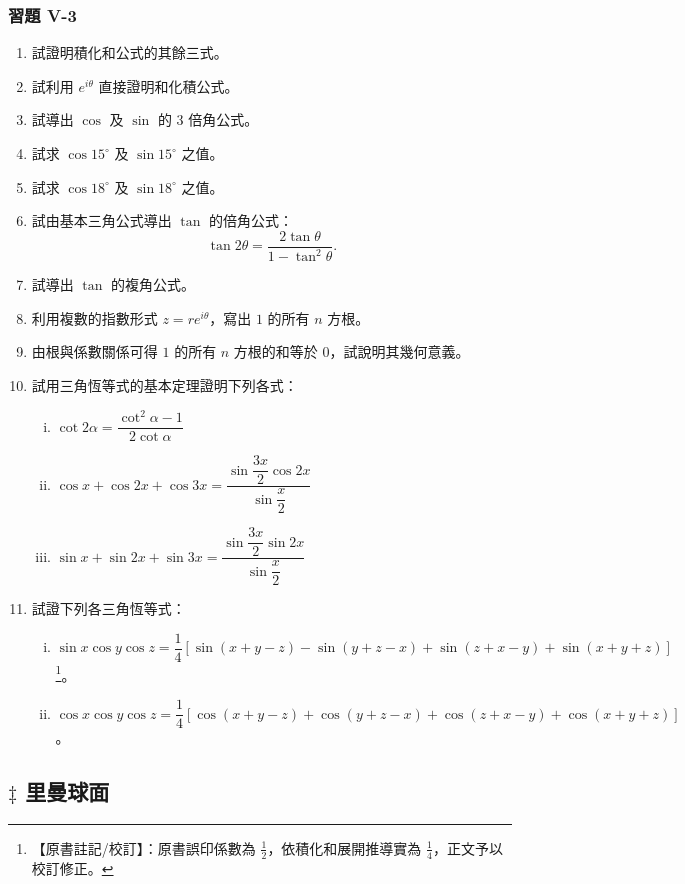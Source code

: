 \subsubsection*{習題 V-3}

\begin{enumerate}
  \item 試證明積化和公式的其餘三式。
  \item 試利用 $e^{i\theta}$ 直接證明和化積公式。
  \item 試導出 $\cos$ 及 $\sin$ 的 $3$ 倍角公式。
  \item 試求 $\cos 15^\circ$ 及 $\sin 15^\circ$ 之值。
  \item[$^*$\theenumi.] 試求 $\cos 18^\circ$ 及 $\sin 18^\circ$ 之值。
  \item 試由基本三角公式導出 $\tan$ 的倍角公式：
  \[
  \tan 2\theta = \frac{2\tan\theta}{1-\tan^2\theta}.
  \]
  \item 試導出 $\tan$ 的複角公式。
  \item[$^*$\theenumi.] 利用複數的指數形式 $z=re^{i\theta}$，寫出 $1$ 的所有 $n$ 方根。
  \item 由根與係數關係可得 $1$ 的所有 $n$ 方根的和等於 $0$，試說明其幾何意義。
  \item 試用三角恆等式的基本定理證明下列各式：
  \begin{enumerate}[(i)]
    \item $\cot 2\alpha = \dfrac{\cot^2\alpha-1}{2\cot\alpha}$
    \item $\cos x+\cos 2x+\cos 3x = \dfrac{\sin\dfrac{3x}{2}\cos 2x}{\sin\dfrac{x}{2}}$
    \item $\sin x+\sin 2x+\sin 3x = \dfrac{\sin\dfrac{3x}{2}\sin 2x}{\sin\dfrac{x}{2}}$
  \end{enumerate}
  \item 試證下列各三角恆等式：
  \begin{enumerate}[(i)]
    \item $\sin x\cos y\cos z = \dfrac{1}{4}[\sin(x+y-z)-\sin(y+z-x)+\sin(z+x-y)+\sin(x+y+z)]$\label{note:b4s-ch5-p286-errata}\footnote{【原書註記/校訂】：原書誤印係數為 $\frac{1}{2}$，依積化和展開推導實為 $\frac{1}{4}$，正文予以校訂修正。}。
    \item $\cos x\cos y\cos z = \dfrac{1}{4}[\cos(x+y-z)+\cos(y+z-x)+\cos(z+x-y)+\cos(x+y+z)]$。
  \end{enumerate}
\end{enumerate}


\subsection{\texorpdfstring{$\ddagger$ }{‡ }里曼球面}\label{sec:b4s-5-4}

